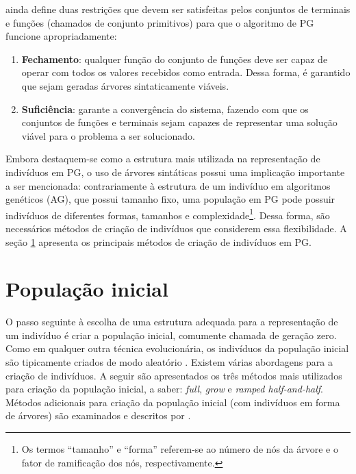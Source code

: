  ainda define duas restrições que devem ser satisfeitas pelos conjuntos de terminais e funções (chamados de conjunto primitivos) para que o algoritmo de PG funcione apropriadamente:

\begin{enumerate}
    \item \textbf{Fechamento}: qualquer função do conjunto de funções deve ser capaz de operar com todos os valores recebidos como entrada. Dessa forma, é garantido que sejam geradas árvores sintaticamente viáveis.
    \item \textbf{Suficiência}: garante a convergência do sistema, fazendo com que os conjuntos de funções e terminais sejam capazes de representar uma solução viável para o problema a ser solucionado.
\end{enumerate}

Embora destaquem-se como a estrutura mais utilizada na representação de indivíduos em PG, o uso de árvores sintáticas possui uma implicação importante a ser mencionada: contrariamente à estrutura de um indivíduo em algoritmos genéticos (AG), que possui tamanho fixo, uma população em PG pode possuir indivíduos de diferentes formas, tamanhos e complexidade\footnote{Os termos ``tamanho'' e ``forma'' referem-se ao número de nós da árvore e o fator de ramificação dos nós, respectivamente.}. Dessa forma, são necessários métodos de criação de indivíduos que considerem essa flexibilidade. A seção \ref{sec:initial-population} apresenta os principais métodos de criação de indivíduos em PG.

\section{População inicial} \label{sec:initial-population}
O passo seguinte à escolha de uma estrutura adequada para a representação de um indivíduo é criar a população inicial, comumente chamada de geração zero. Como em qualquer outra técnica evolucionária, os indivíduos da população inicial são tipicamente criados de modo aleatório \cite{poli2008,banzhaf1998}. Existem várias abordagens para a criação de indivíduos. A seguir são apresentados os três métodos mais utilizados para criação da população inicial, a saber: \textit{full}, \textit{grow} e \textit{ramped half-and-half}. Métodos adicionais para criação da população inicial (com indivíduos em forma de árvores) são examinados e descritos por .

